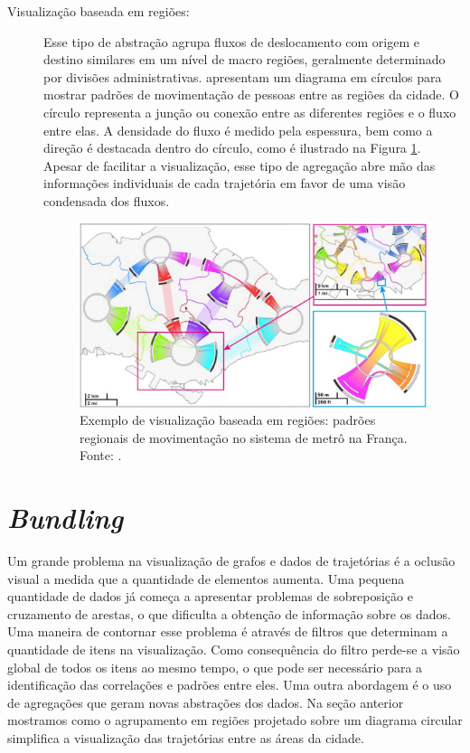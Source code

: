 \begin{description}
  \item[Visualização baseada em regiões:] Esse tipo de abstração agrupa fluxos
de deslocamento com origem e destino similares em um nível de macro regiões,
geralmente determinado por divisões administrativas.  \citet{Zeng2013}
apresentam um diagrama em círculos para mostrar padrões de movimentação de
pessoas entre as regiões da cidade. O círculo representa a junção ou conexão
entre as diferentes regiões e o fluxo entre elas. A densidade do fluxo é medido
pela espessura, bem como a direção é destacada dentro do círculo, como é
ilustrado na Figura \ref{fig:interchange-circo}. Apesar de facilitar a
visualização, esse tipo de agregação abre mão das informações individuais de
cada trajetória em favor de uma visão condensada dos fluxos.

\begin{figure}[!htb]
  \centering
  \includegraphics[width=1\textwidth]{../figuras/region-based.png}
  \caption[Exemplo de visualização baseada em regiões do sistema de metrô na França]{Exemplo de visualização baseada em regiões: padrões regionais de movimentação no sistema de metrô na França. Fonte: \citet{Zeng2013}.}
  \label{fig:interchange-circo}
\end{figure}
\end{description}

\section{\emph{Bundling}}
\label{sec:bundling}

  Um grande problema na visualização de grafos e dados de trajetórias é a
oclusão visual a medida que a quantidade de elementos aumenta. Uma pequena
quantidade de dados já começa a apresentar problemas de sobreposição e
cruzamento de arestas, o que dificulta a obtenção de informação sobre os dados.
Uma maneira de contornar esse problema é através de filtros que determinam a
quantidade de itens na visualização. Como consequência do filtro perde-se a
visão global de todos os itens ao mesmo tempo, o que pode ser necessário para a
identificação das correlações e padrões entre eles. Uma outra abordagem é o uso
de agregações que geram novas abstrações dos dados. Na seção anterior mostramos
como o agrupamento em regiões projetado sobre um diagrama circular simplifica a
visualização das trajetórias entre as áreas da cidade.

